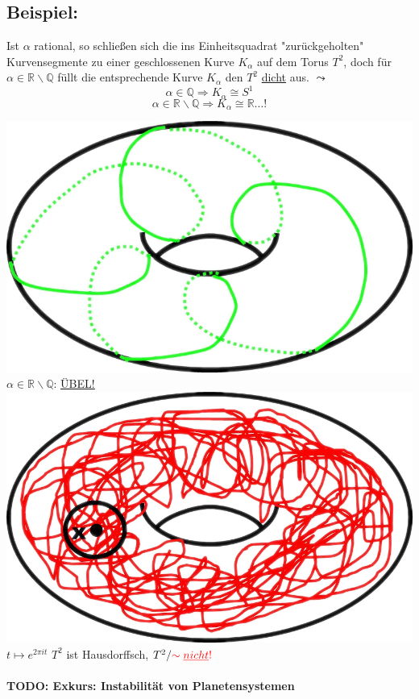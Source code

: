 \documentclass[a4paper,11pt,notitlepage]{report}
\theoremstyle{definition}
\newcommand{\R}{{\ensuremath{\mathbb{R}}}}
\newcommand{\Q}{{\ensuremath{\mathbb{Q}}}}
\newenvironment{bsp}[1]
{
\setlength{\fboxsep}{10pt}
\subsection*{Beispiel: #1}
\begin{upshape}
}
{
\end{upshape}
}
\begin{document}
\begin{bsp}{}
	Ist $\alpha$ rational, so schließen sich die ins Einheitsquadrat "zurückgeholten" Kurvensegmente zu einer geschlossenen Kurve $K_\alpha$ auf dem Torus $T^2$, doch für $\alpha \in \R \backslash \Q$ füllt die entsprechende Kurve $K_\alpha$ den $T^2$ \underline{dicht} aus. $\leadsto$
	$$\alpha \in \Q \Rightarrow K_\alpha \cong S^1$$
	$$\alpha \in \R \backslash \Q \Rightarrow K_\alpha \cong \R \ldots !$$	
	
	\includegraphics[scale=0.5]{images/Linien_Torus_rational.png}
	\newline
	$\alpha \in \R \backslash \Q$: \underline{\underline{ÜBEL!}}\newline
	\includegraphics[scale=0.5]{images/Linien_Torus_irrational.png}
	\newline
	$t \mapsto e^{2 \pi i t}$
	\newline
	$T^2$ ist Hausdorffsch, $T^2/\textcolor{red}{\sim \underline{nicht}!}$
\end{bsp}

\paragraph{TODO: Exkurs: Instabilität von Planetensystemen}
\end{document}
